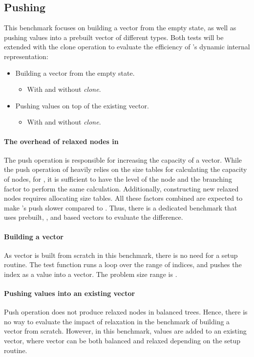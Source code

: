 \subsection{Pushing}
This benchmark focuses on building a vector from the empty state, as well as pushing values into a prebuilt vector of different types. Both tests will be extended with the clone operation to evaluate the efficiency of \pvec{}'s dynamic internal representation:
\begin{itemize}
    \item Building a vector from the empty state.
    \begin{itemize}
        \item With and without \emph{clone}.
    \end{itemize}
    \item Pushing values on top of the existing vector.
    \begin{itemize}
        \item With and without \emph{clone}.
    \end{itemize}
\end{itemize}

\paragraph{The overhead of relaxed nodes in \rrbtree{}}
The push operation is responsible for increasing the capacity of a vector. While the push operation of \rrbtree{} heavily relies on the size tables for calculating the capacity of nodes, for \rbtree{}, it is sufficient to have the level of the node and the branching factor to perform the same calculation. Additionally, constructing new relaxed nodes requires allocating size tables. All these factors combined are expected to make \rrbtree{}'s push slower compared to \rbtree{}. Thus, there is a dedicated benchmark that uses prebuilt, \rrbtree{}, and \rbtree{} based vectors to evaluate the difference.

\paragraph{Building a vector}
As vector is built from scratch in this benchmark, there is no need for a setup routine. The test function runs a loop over the \range{[0, N)} range of indices, and pushes the index as a value into a vector. The problem size range is \range{[20, \mega{1}]}.

\paragraph{Pushing values into an existing vector}
Push operation does not produce relaxed nodes in balanced trees. Hence, there is no way to evaluate the impact of relaxation in the benchmark of building a vector from scratch. However, in this benchmark, values are added to an existing vector, where vector can be both balanced and relaxed depending on the setup routine.

